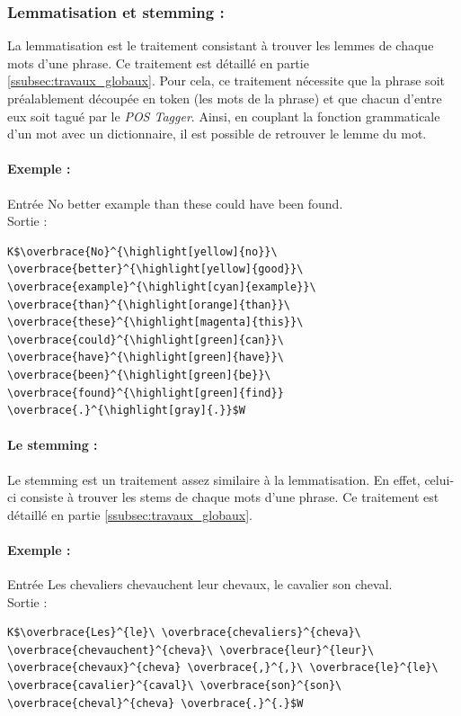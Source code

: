             \subsubsection{Lemmatisation et stemming :}
                La lemmatisation est le traitement consistant à trouver les lemmes de chaque mots d'une phrase. Ce traitement est détaillé en partie \ref{ssubsec:travaux_globaux}. Pour cela, ce traitement nécessite que la phrase soit préalablement découpée en token (les mots de la phrase) et que chacun d'entre eux soit tagué par le \textit{POS Tagger}. Ainsi, en couplant la fonction grammaticale d'un mot avec un dictionnaire, il est possible de retrouver le lemme du mot.

                \paragraph{Exemple :}
                Entrée \og No better example than these could have been found.\fg\\
                Sortie :
\begin{lstlisting}
K$\overbrace{No}^{\highlight[yellow]{no}}\ \overbrace{better}^{\highlight[yellow]{good}}\ \overbrace{example}^{\highlight[cyan]{example}}\ \overbrace{than}^{\highlight[orange]{than}}\ \overbrace{these}^{\highlight[magenta]{this}}\ \overbrace{could}^{\highlight[green]{can}}\ \overbrace{have}^{\highlight[green]{have}}\ \overbrace{been}^{\highlight[green]{be}}\ \overbrace{found}^{\highlight[green]{find}} \overbrace{.}^{\highlight[gray]{.}}$W
\end{lstlisting}

                \paragraph{Le stemming :}
                Le stemming est un traitement assez similaire à la lemmatisation. En effet, celui-ci consiste à trouver les stems de chaque mots d'une phrase. Ce traitement est détaillé en partie \ref{ssubsec:travaux_globaux}.

                \paragraph{Exemple :}
                Entrée \og Les chevaliers chevauchent leur chevaux, le cavalier son cheval.\fg\\
                Sortie :
\begin{lstlisting}
K$\overbrace{Les}^{le}\ \overbrace{chevaliers}^{cheva}\ \overbrace{chevauchent}^{cheva}\ \overbrace{leur}^{leur}\ \overbrace{chevaux}^{cheva} \overbrace{,}^{,}\ \overbrace{le}^{le}\ \overbrace{cavalier}^{caval}\ \overbrace{son}^{son}\ \overbrace{cheval}^{cheva} \overbrace{.}^{.}$W
\end{lstlisting}

